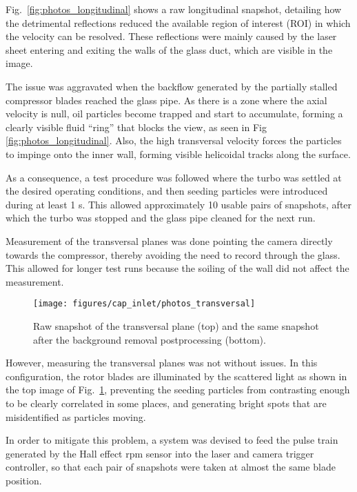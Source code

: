 Fig.~\ref{fig:photos_longitudinal} shows a raw longitudinal snapshot, detailing how the detrimental reflections reduced the available region of interest (ROI) in which the velocity can be resolved. These reflections were mainly caused by the laser sheet entering and exiting the walls of the glass duct, which are visible in the image.

The issue was aggravated when the backflow generated by the partially stalled compressor blades reached the glass pipe. As there is a zone where the axial velocity is null, oil particles become trapped and start to accumulate, forming a clearly visible fluid ``ring'' that blocks the view, as seen in Fig \ref{fig:photos_longitudinal}. Also, the high transversal velocity forces the particles to impinge onto the inner wall, forming visible helicoidal tracks along the surface.

As a consequence, a test procedure was followed where the turbo was settled at the desired operating conditions, and then seeding particles were introduced during at least 1 s. This allowed approximately 10 usable pairs of snapshots, after which the turbo was stopped and the glass pipe cleaned for the next run.

Measurement of the transversal planes was done pointing the camera directly towards the compressor, thereby avoiding the need to record through the glass. This allowed for longer test runs because the soiling of the wall did not affect the measurement.

\begin{figure}[!t]
\centering
\texttt{[image: figures/cap\_inlet/photos\_transversal]}
\caption[Raw images of the transversal plane PIV measurement]{Raw snapshot of the transversal plane (top) and the same snapshot after the background removal postprocessing (bottom).}
\label{fig:photos_transversal}
\end{figure}

However, measuring the transversal planes was not without issues. In this configuration, the rotor blades are illuminated by the scattered light as shown in the top image of Fig.~\ref{fig:photos_transversal}, preventing the seeding particles from contrasting enough to be clearly correlated in some places, and generating bright spots that are misidentified as particles moving.

In order to mitigate this problem, a system was devised to feed the pulse train generated by the Hall effect rpm sensor into the laser and camera trigger controller, so that each pair of snapshots were taken at almost the same blade position.

